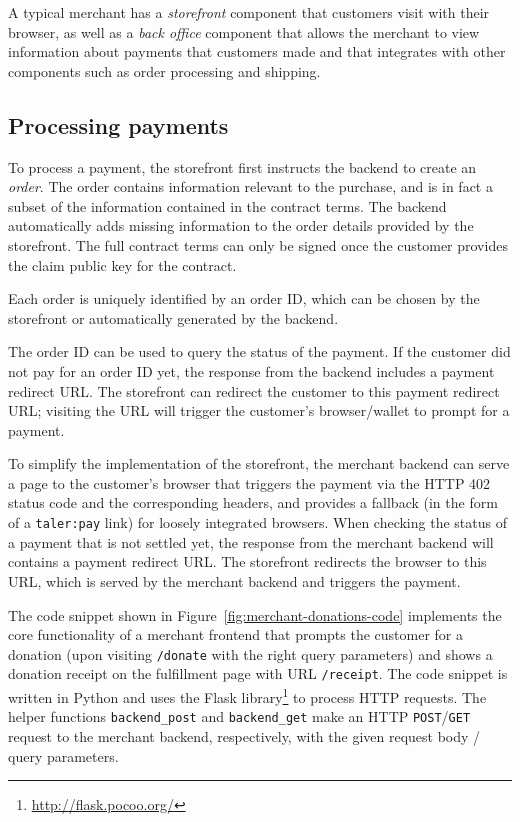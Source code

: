 A typical merchant has a \emph{storefront} component that customers visit with
their browser, as well as a \emph{back office} component that allows the
merchant to view information about payments that customers made and that integrates
with other components such as order processing and shipping.

\subsection{Processing payments}\label{sec:processing-payments}
To process a payment, the storefront first instructs the backend to create an
\emph{order}.  The order contains information relevant to the purchase, and is
in fact a subset of the information contained in the contract terms.  The
backend automatically adds missing information to the order details provided by
the storefront.  The full contract terms can only be signed once the customer
provides the claim public key for the contract.

Each order is uniquely identified by an order ID, which can be chosen by the
storefront or automatically generated by the backend.

The order ID can be used to query the status of the payment.  If the customer
did not pay for an order ID yet, the response from the backend includes a
payment redirect URL.  The storefront can redirect the customer to this
payment redirect URL; visiting the URL will trigger the customer's
browser/wallet to prompt for a payment.

To simplify the implementation of the storefront, the merchant backend can
serve a page to the customer's browser that triggers the payment via the HTTP
402 status code and the corresponding headers, and provides a fallback (in the
form of a \texttt{taler:pay} link) for loosely integrated browsers.
When checking the status of a payment that is not settled yet, the response from the merchant backend
will contains a payment redirect URL.  The storefront redirects the browser to this URL,
which is served by the merchant backend and triggers the payment.

The code snippet shown in Figure~\ref{fig:merchant-donations-code} implements
the core functionality of a merchant frontend that prompts the customer for a
donation (upon visiting \texttt{/donate} with the right query parameters) and
shows a donation receipt on the fulfillment page with URL \texttt{/receipt}.
The code snippet is written in Python and uses the Flask library\footnote{\url{http://flask.pocoo.org/}} to process HTTP requests.
The helper functions \texttt{backend\_post}
and \texttt{backend\_get} make an HTTP \texttt{POST}/\texttt{GET} request to the merchant backend, respectively,
with the given request body / query parameters.

